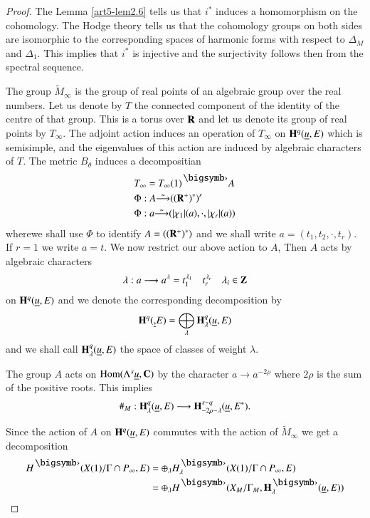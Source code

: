 \begin{proof}
The Lemma \ref{art5-lem2.6} tells us that $i^\ast$ induces a homomorphism on the cohomology. The Hodge theory tells us that the cohomology groups on both sides are isomorphic to the corresponding spaces of harmonic forms with respect to $\Delta_M$ and $\Delta_1$. This implies that $i^\ast$ is injective and the surjectivity  follows then from the spectral sequence.

The group $\tilde{M}_\infty$ is the group of real points of an algebraic group over the real numbers. Let us denote by $T$ the connected component of the identity of the centre of that group.  This is a torus over $\mathbf{R}$ and let us denote its group of real points by $T_\infty$. The adjoint action induces an operation of $T_\infty$ on $\mathbf{H}^q (\underline{u}, E)$ which is semisimple, and the eigenvalues of this action are induced by algebraic characters of $T$. The metric $B_\theta$ induces a decompositian
\setcounter{equation}{8}
\begin{align}
& T_\infty = T_\infty (1)^\bigdot A \notag\\
& \Phi : A \tilde{\longrightarrow} ((\bR^+)^\ast)^r \notag\\
&  \Phi : a \tilde{\longrightarrow} (|\chi_1| (a), \cdot, |\chi_r| (a)) 
\label{art5-eq2.9}
\end{align}
where\pageoriginale we shall use $\Phi$ to identify $A = ((\mathbf{R}^+)^\ast)$ and we shall write $a = (t_1, t_2 , \cdot , t_r)$. If $r =1$ we write $a =t$. We now restrict our above action to $A$, Then $A$ acts  by algebraic characters
$$
\lambda: a \longrightarrow a^\lambda = t_1^{\lambda_1} \quad t^{\lambda_r}_{r} \quad \lambda_i \in \mathbf{Z}
$$
on $\mathbf{H}^q (\underline{u}, E)$ and we denote the corresponding decomposition by 
\setcounter{equation}{9}
\begin{equation}
\mathbf{H}^q (\underline, E) = \bigoplus\limits_\lambda \mathbf{H}^q_\lambda (\underline{u}, E) 
\label{art5-eq2.10}
\end{equation}
 and we shall call $\mathbf{H}^q_\lambda (\underline{u}, E)$ the space of classes of weight $\lambda$.

The group $A$ acts on $\operatorname{Hom} (\Lambda^s\underline{u}, \mathbf{C})$ by the character $a \to a^{-2\rho}$ where $2\rho$ is the sum of the positive roots. This implies 
$$
\#_M : \mathbf{H}^q_\lambda (\underline{u}, E) \longrightarrow \mathbf{H}^{s-q}_{-2\rho -\lambda} (\underline{u}, E^\ast).
$$

Since the action of $A$ on $\mathbf{H}^q (\underline{u}, E)$ commutes with the action of $\tilde{M}_\infty$ we get a decomposition
\begin{align*}
H^\bigdot (X (1)/ \Gamma \cap P_\infty, E) & = \oplus_\lambda H^\bigdot_\lambda (X (1) / \Gamma \cap P_\infty, E)\\
& = \oplus_\lambda H^\bigdot (X_M / \Gamma_M, \bH^\bigdot_\lambda (\underline{u}, E))
\end{align*}
\end{proof}

